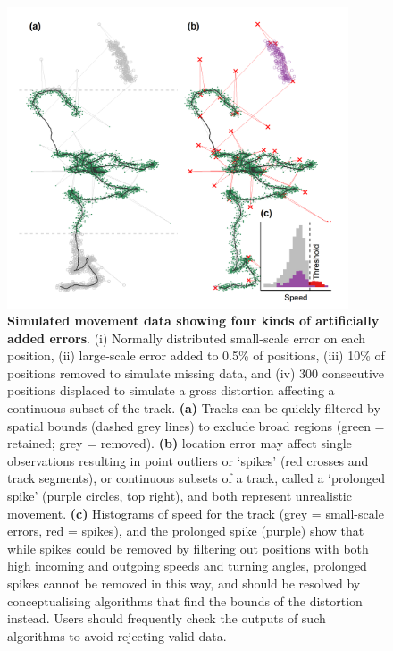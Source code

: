     \begin{figure}[ht!]
        \centering
        \includegraphics[width=0.9\textwidth]{figures/preprocessing/fig_03.png}
        \caption{
            \textbf{Simulated movement data showing four kinds of artificially added errors}.
            (i) Normally distributed small-scale error on each position, (ii) large-scale error added to 0.5\% of positions, (iii) 10\% of positions removed to simulate missing data, and (iv) 300 consecutive positions displaced to simulate a gross distortion affecting a continuous subset of the track.
            \textbf{(a)} Tracks can be quickly filtered by spatial bounds (dashed grey lines) to exclude broad regions (green = retained; grey = removed).
            \textbf{(b)} location error may affect single observations resulting in point outliers or `spikes' (red crosses and track segments), or continuous subsets of a track, called a `prolonged spike' (purple circles, top right), and both represent unrealistic movement.
            \textbf{(c)} Histograms of speed for the track (grey = small-scale errors, red = spikes), and the prolonged spike (purple) show that while spikes could be removed by filtering out positions with both high incoming and outgoing speeds and turning angles, prolonged spikes cannot be removed in this way, and should be resolved by conceptualising algorithms that find the bounds of the distortion instead.
            Users should frequently check the outputs of such algorithms to avoid rejecting valid data.
        }
        \label{preproc_fig_03}
    \end{figure}

